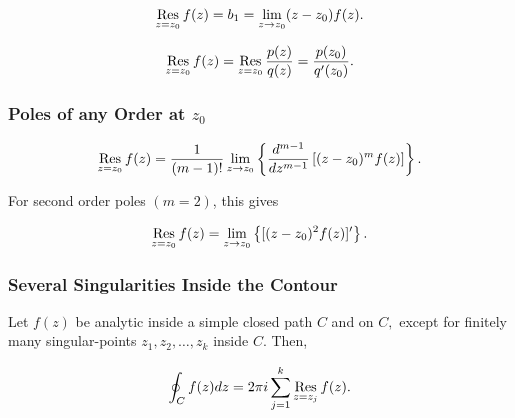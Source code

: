 \documentclass{article}
\begin{document}
\begin{theorem}\label{first-simple-pole-residue-formula}
\[ \operatorname*{Res}_{z=z_0} f(z) = b_1 = \lim_{z \to z_0} (z - z_0) f(z). \]
\end{theorem}

\begin{theorem}\label{second-simple-pole-residue-formula}
\[ \operatorname*{Res}_{z=z_0} f(z) = \operatorname*{Res}_{z=z_0} \frac{p(z)}{q(z)} = \frac{p(z_0)}{q'(z_0)}. \]
\end{theorem}

\subsubsection{Poles of any Order at $z_0$}

\begin{theorem}\label{residue-at-mth-order-pole}
\[ \operatorname*{Res}_{z=z_0} f(z) = \frac{1}{(m - 1)!} \lim_{z \to z_0} \left\{ \frac{d^{m-1}}{dz^{m-1}} \left[(z - z_0)^m f(z)\right] \right\}. \]
\end{theorem}

\detach

\begin{remark}
For second order \@{poles} $(m = 2)$, this gives

\[ \operatorname*{Res}_{z = z_0} f(z) = \lim_{z \to z_0} \left\{ [(z - z_0)^2 f(z)]' \right\}. \]
\end{remark}

\subsubsection{Several Singularities Inside the Contour}

\begin{theorem}\label{residue-theorem}
Let $f(z)$ be \@{analytic} inside a simple closed path $C$ and on $C,$ except for finitely many \@{singular-points} $z_1, z_2, \dots, z_k$ inside $C.$ Then,

\[ \oint_C f(z) dz = 2 \pi i \sum_{j=1}^{k} \operatorname*{Res}_{z = z_j} f(z). \]
\end{theorem}
\end{document}

